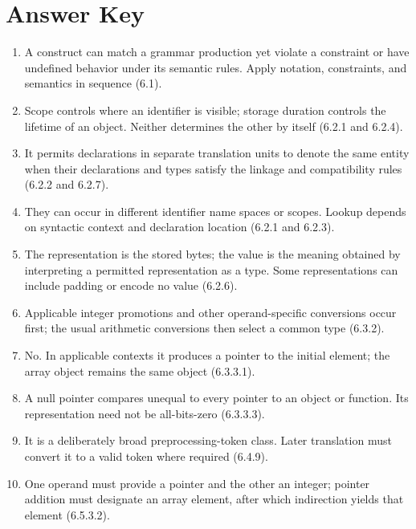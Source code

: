 \documentclass[10pt,letterpaper]{article}
\begin{document}
\clearpage
\section{Answer Key}
\begin{enumerate}
  \item A construct can match a grammar production yet violate a constraint or have undefined behavior under its semantic rules. Apply notation, constraints, and semantics in sequence (6.1).

  \item Scope controls where an identifier is visible; storage duration controls the lifetime of an object. Neither determines the other by itself (6.2.1 and 6.2.4).

  \item It permits declarations in separate translation units to denote the same entity when their declarations and types satisfy the linkage and compatibility rules (6.2.2 and 6.2.7).

  \item They can occur in different identifier name spaces or scopes. Lookup depends on syntactic context and declaration location (6.2.1 and 6.2.3).

  \item The representation is the stored bytes; the value is the meaning obtained by interpreting a permitted representation as a type. Some representations can include padding or encode no value (6.2.6).

  \item Applicable integer promotions and other operand-specific conversions occur first; the usual arithmetic conversions then select a common type (6.3.2).

  \item No. In applicable contexts it produces a pointer to the initial element; the array object remains the same object (6.3.3.1).

  \item A null pointer compares unequal to every pointer to an object or function. Its representation need not be all-bits-zero (6.3.3.3).

  \item It is a deliberately broad preprocessing-token class. Later translation must convert it to a valid token where required (6.4.9).

  \item One operand must provide a pointer and the other an integer; pointer addition must designate an array element, after which indirection yields that element (6.5.3.2).


\end{enumerate}
\end{document}
